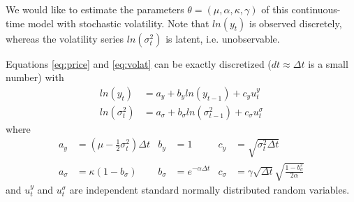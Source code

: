 \documentclass{article}
\begin{document}
We would like to estimate the parameters $\theta=(\mu,\alpha,\kappa,\gamma)$ of this continuous-time model with stochastic volatility. Note that $ln(y_t)$ is observed discretely, whereas the volatility series $ln(\sigma_t^2)$ is latent, i.e. unobservable.

Equations \eqref{eq:price} and \eqref{eq:volat} can be exactly discretized ($dt\approx \Delta t$ is a small number) with
    \begin{align}
      ln(y_t) &= a_y + b_y ln(y_{t-1}) +  c_y u^y_t\label{eq:discy}\\
      ln(\sigma_t^2) &= a_\sigma + b_\sigma ln(\sigma_{t-1}^2) + c_\sigma u_t^\sigma\label{eq:discsigma}
    \end{align}
    where
    \begin{align*}
    a_y &=\left(\mu-\frac{1}{2}\sigma_t^2\right)\Delta t&
    b_y &= 1&
    c_y &= \sqrt{\sigma_t^2\Delta t}\\
    a_\sigma&=\kappa\left(1-b_\sigma\right)&
    b_\sigma&=e^{-\alpha\Delta t}&
    c_\sigma&=\gamma\sqrt{\Delta t} \sqrt{\frac{1-b_\sigma^2}{2\alpha}}
    \end{align*}
    and $u_t^y$ and $u_t^\sigma$ are independent standard normally distributed random variables.
\end{document}
